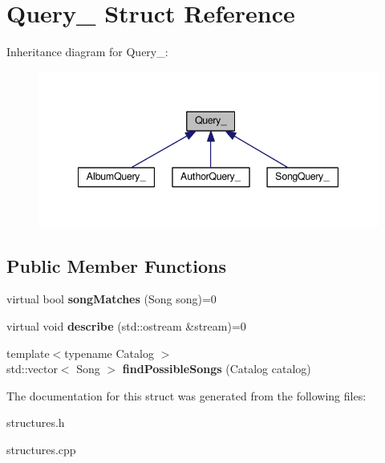 \hypertarget{struct_query__}{}\section{Query\+\_\+ Struct Reference}
\label{struct_query__}


Inheritance diagram for Query\+\_\+\+:
\nopagebreak
\begin{figure}[H]
\begin{center}
\leavevmode
\includegraphics[width=341pt]{struct_query____inherit__graph}
\end{center}
\end{figure}
\subsection*{Public Member Functions}
\begin{DoxyCompactItemize}
\item 
virtual bool {\bfseries song\+Matches} (Song song)=0\hypertarget{struct_query___ae87a04ddd35d72aa7b78acc74049abac}{}\label{struct_query___ae87a04ddd35d72aa7b78acc74049abac}

\item 
virtual void {\bfseries describe} (std\+::ostream \&stream)=0\hypertarget{struct_query___a3b46cf0d317a537e5085f448de42e76b}{}\label{struct_query___a3b46cf0d317a537e5085f448de42e76b}

\item 
{\footnotesize template$<$typename Catalog $>$ }\\std\+::vector$<$ Song $>$ {\bfseries find\+Possible\+Songs} (Catalog catalog)\hypertarget{struct_query___a5f8a9a129903856245b816070aa7264a}{}\label{struct_query___a5f8a9a129903856245b816070aa7264a}

\end{DoxyCompactItemize}


The documentation for this struct was generated from the following files\+:\begin{DoxyCompactItemize}
\item 
structures.\+h\item 
structures.\+cpp\end{DoxyCompactItemize}
